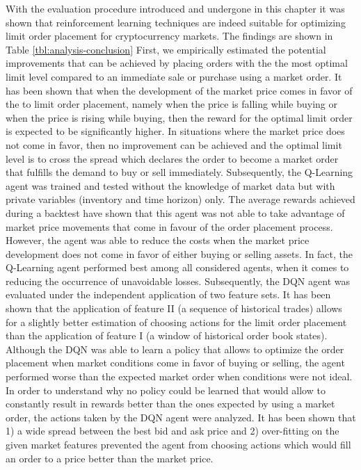 With the evaluation procedure introduced and undergone in this chapter it was shown that reinforcement learning techniques are indeed suitable for optimizing limit order placement for cryptocurrency markets.
The findings are shown in Table \ref{tbl:analysis-conclusion}
First, we empirically estimated the potential improvements that can be achieved by placing orders with the the most optimal limit level compared to an immediate sale or purchase using a market order.
It has been shown that when the development of the market price comes in favor of the to limit order placement, namely when the price is falling while buying or when the price is rising while buying, then the reward for the optimal limit order is expected to be significantly higher.
In situations where the market price does not come in favor, then no improvement can be achieved and the optimal limit level is to cross the spread which declares the order to become a market order that fulfills the demand to buy or sell immediately.
Subsequently, the Q-Learning agent was trained and tested without the knowledge of market data but with private variables (inventory and time horizon) only.
The average rewards achieved during a backtest have shown that this agent was not able to take advantage of market price movements that come in favour of the order placement process.
However, the agent was able to reduce the costs when the market price development does not come in favor of either buying or selling assets.
In fact, the Q-Learning agent performed best among all considered agents, when it comes to reducing the occurrence of unavoidable losses.
Subsequently, the DQN agent was evaluated under the independent application of two feature sets.
It has been shown that the application of feature II (a sequence of historical trades) allows for a slightly better estimation of choosing actions for the limit order placement than the application of feature I (a window of historical order book states).
Although the DQN was able to learn a policy that allows to optimize the order placement when market conditions come in favor of buying or selling, the agent performed worse than the expected market order when conditions were not ideal.
In order to understand why no policy could be learned that would allow to constantly result in rewards better than the ones expected by using a market order, the actions taken by the DQN agent were analyzed.
It has been shown that 1) a wide spread between the best bid and ask price and 2) over-fitting on the given market features prevented the agent from choosing actions which would fill an order to a price better than the market price.
